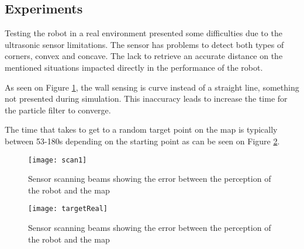\subsection{Experiments}

Testing the robot in a real environment presented some difficulties due to the  ultrasonic sensor limitations. The sensor has problems to detect both types of corners, convex and concave. The lack to retrieve an accurate distance on the mentioned situations impacted directly in the performance of the robot.

As seen on Figure \ref{fig:scan1}, the wall sensing is curve instead of a straight line, something not presented during simulation. This inaccuracy leads to increase the time for the particle filter to converge.
	
The time that takes to get to a random target point on the map is typically between 53-180s depending on the starting point as can be seen on Figure \ref{fig:targetReal}. 
	
		\begin{figure}[h]
			\centering
			\texttt{[image: scan1]}
			\caption{Sensor scanning beams showing the error between the perception of the robot and the map}
			\label{fig:scan1}
		\end{figure}

		\begin{figure}[h]
			\centering
			\texttt{[image: targetReal]}
			\caption{Sensor scanning beams showing the error between the perception of the robot and the map}
			\label{fig:targetReal}
		\end{figure}	

\FloatBarrier